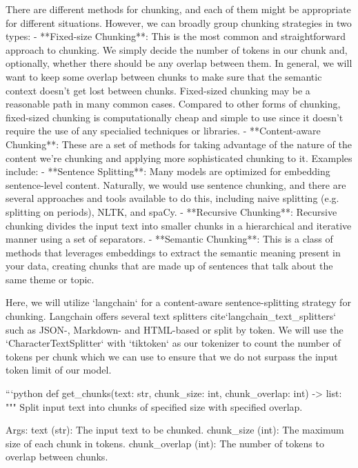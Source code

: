 {{There are different methods for chunking, and each of them might be appropriate for different situations. However, we can broadly group chunking strategies in two types:
- **Fixed-size Chunking**: This is the most common and straightforward approach to chunking. We simply decide the number of tokens in our chunk and, optionally, whether there should be any overlap between them. In general, we will want to keep some overlap between chunks to make sure that the semantic context doesn’t get lost between chunks. Fixed-sized chunking may be a reasonable path in many common cases. Compared to other forms of chunking, fixed-sized chunking is computationally cheap and simple to use since it doesn’t require the use of any specialied techniques or libraries.
- **Content-aware Chunking**: These are a set of methods for taking advantage of the nature of the content we’re chunking and applying more sophisticated chunking to it. Examples include:
  - **Sentence Splitting**: Many models are optimized for embedding sentence-level content. Naturally, we would use sentence chunking, and there are several approaches and tools available to do this, including naive splitting (e.g. splitting on periods), NLTK, and spaCy.
  - **Recursive Chunking**: Recursive chunking divides the input text into smaller chunks in a hierarchical and iterative manner using a set of separators.
  - **Semantic Chunking**: This is a class of methods that leverages embeddings to extract the semantic meaning present in your data, creating chunks that are made up of sentences that talk about the same theme or topic.

  Here, we will utilize `langchain` for a content-aware sentence-splitting strategy for chunking. Langchain offers several text splitters {cite}`langchain_text_splitters` such as JSON-, Markdown- and HTML-based or split by token. We will use the `CharacterTextSplitter` with `tiktoken` as our tokenizer to count the number of tokens per chunk which we can use to ensure that we do not surpass the input token limit of our model.



```python
def get_chunks(text: str, chunk_size: int, chunk_overlap: int) -> list:
    """
    Split input text into chunks of specified size with specified overlap.

    Args:
        text (str): The input text to be chunked.
        chunk_size (int): The maximum size of each chunk in tokens.
        chunk_overlap (int): The number of tokens to overlap between chunks.

}}

